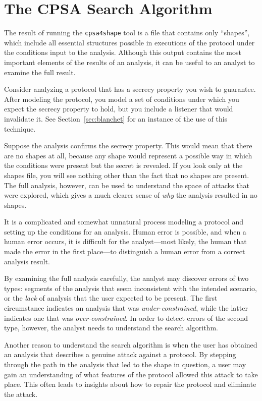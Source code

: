 \chapter{The CPSA Search Algorithm}
\label{ch:algorithm}

The result of running the \texttt{cpsa4shape} tool is a file that
contains only ``shapes'', which include all essential structures
possible in executions of the protocol under the conditions input to
the analysis.  Although this output contains the most important
elements of the results of an analysis, it can be useful to an analyst
to examine the full result.

Consider analyzing a protocol that has a secrecy property you wish to
guarantee.  After modeling the protocol, you model a set of conditions
under which you expect the secrecy property to hold, but you include a
listener that would invalidate it.  See Section~\ref{sec:blanchet} for
an instance of the use of this technique.

Suppose the analysis confirms the secrecy property.  This would mean
that there are no shapes at all, because any shape would represent a
possible way in which the conditions were present but the secret is
revealed.  If you look only at the shapes file, you will see nothing
other than the fact that no shapes are present.  The full analysis,
however, can be used to understand the space of attacks that were
explored, which gives a much clearer sense of \emph{why} the analysis
resulted in no shapes.

It is a complicated and somewhat unnatural process modeling a protocol
and setting up the conditions for an analysis.  Human error is
possible, and when a human error occurs, it is difficult for the
analyst---most likely, the human that made the error in the first
place---to distinguish a human error from a correct analysis result.

By examining the full analysis carefully, the analyst may discover
errors of two types: segments of the analysis that seem inconsistent
with the intended scenario, or the \emph{lack} of analysis that the
user expected to be present.  The first circumstance indicates an
analysis that was \emph{under-constrained}, while the latter indicates
one that was \emph{over-constrained}.  In order to detect errors of
the second type, however, the analyst needs to understand the search
algorithm.

Another reason to understand the search algorithm is when the user has
obtained an analysis that describes a genuine attack against a
protocol.  By stepping through the path in the analysis that led to
the shape in question, a user may gain an understanding of what
features of the protocol allowed this attack to take place. This often
leads to insights about how to repair the protocol and eliminate the
attack.

